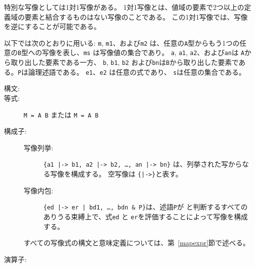 \documentclass[\pformat,12pt]{jarticle}
\begin{document}
特別な写像としては1対1写像がある。 
1対1写像とは、値域の要素で2つ以上の定義域の要素と結合するものはない写像のことである。
この1対1写像では、写像を逆にすることが可能である。

以下では次のとおりに用いる: {\tt m}, {\tt m1}、および{\tt m2} は、任意の{\tt A}型からもう1つの任意の{\tt B}型への写像を表し、{\tt ms} は写像値の集合であり。
 {\tt a}, {\tt a1}, {\tt a2}、および{\tt an}は {\tt A}から取り出した要素である一方、 {\tt b}, {\tt b1}, {\tt b2} および{\tt bn}は{\tt B}から取り出した要素である。{\tt P}は論理述語である。
{\tt  e1}、{\tt e2} は任意の式であり、 {\tt s}は任意の集合である。

\begin{description}
\item[構文:] 
  
  
  

\item[等式:] {\tt M =  A  B} または {\tt M =
     A  B}

\item[構成子:] \mbox{}

  \begin{description}
  \item[写像列挙:] 
{\tt \{a1 |-> b1, a2 |-> b2, \ldots, an |-> bn\}}
    は、列挙された写からなる写像を構成する。 
空写像は {\tt \{|->\}}と表す。

  \item[写像内包:] {\tt \{ed |-> er | bd1, \ldots, bdn \& P\}}は、述語{\tt P}が と判断するすべてのありうる束縛上で、式{\tt ed} と {\tt er}を評価することによって写像を構成する。
  \end{description}
すべての写像式の構文と意味定義については、第~\ref{mapexpr}節で述べる。%


\item[演算子:]\mbox{}


\end{description}
\end{document}
